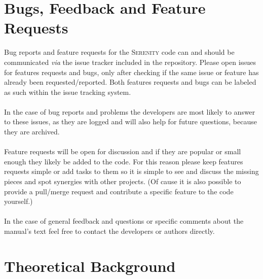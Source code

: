 \documentclass[bibliography=totocnumbered,a4paper,10pt,oneside]{scrbook}
\newcommand{
\serenity}{\textsc{Serenity}\xspace}
\begin{document}
\newpage
\chapter{Bugs, Feedback and Feature Requests}
Bug reports and feature requests for the \serenity code can and should be communicated \textit{via} the issue tracker included in the
repository. Please open issues for features requests and bugs, only after checking if the same issue or feature has already been requested/reported.
Both features requests and bugs can be labeled as such within the issue tracking system.\\
\\
In the case of bug reports and problems the developers are most likely to answer to these issues, as they are logged and will also help for future questions, because they
are archived. \\
\\
Feature requests will be open for discussion and if they are popular or small enough they likely be added to the code.
For this reason please keep features requests simple or add tasks to them so it is simple to see and discuss the missing pieces and spot
synergies with other projects.
(Of cause it is also possible to provide a pull/merge request and contribute a specific feature to the code yourself.)\\
\\
In the case of general feedback and questions or specific comments about the manual's text feel free to contact the developers or authors directly.

\clearpage
\chapter{Theoretical Background}







\clearpage
\end{document}
